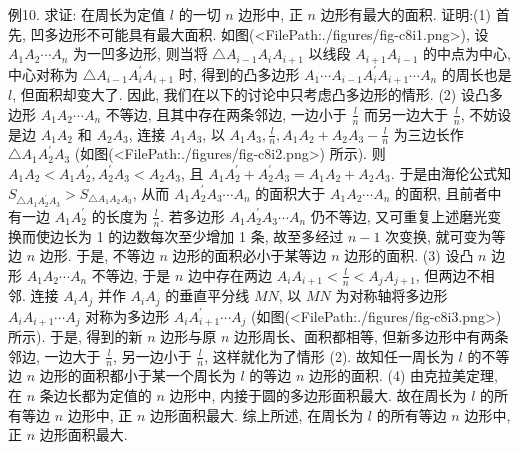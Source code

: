 例10. 求证: 在周长为定值 $l$ 的一切 $n$ 边形中, 正 $n$ 边形有最大的面积.
证明:(1) 首先, 凹多边形不可能具有最大面积.
如图(<FilePath:./figures/fig-c8i1.png>), 设 $A_1 A_2 \cdots A_n$ 为一凹多边形, 则当将 $\triangle A_{i-1} A_i A_{i+1}$ 以线段 $A_{i+1} A_{i-1}$ 的中点为中心, 中心对称为 $\triangle A_{i-1} A_i^{\prime} A_{i+1}$ 时, 得到的凸多边形 $A_1 \cdots A_{i-1} A_i^{\prime} A_{i+1} \cdots A_n$ 的周长也是 $l$, 但面积却变大了.
因此, 我们在以下的讨论中只考虑凸多边形的情形.
(2) 设凸多边形 $A_1 A_2 \cdots A_n$ 不等边, 且其中存在两条邻边, 一边小于 $\frac{l}{n}$ 而另一边大于 $\frac{l}{n}$, 不妨设是边 $A_1 A_2$ 和 $A_2 A_3$, 连接 $A_1 A_3$, 以 $A_1 A_3, \frac{l}{n}, A_1 A_2+ A_2 A_3-\frac{l}{n}$ 为三边长作 $\triangle A_1 A_2^{\prime} A_3$ (如图(<FilePath:./figures/fig-c8i2.png>) 所示).
则 $A_1 A_2<A_1 A_2^{\prime}, A_2^{\prime} A_3<A_2 A_3$, 且 $A_1 A_2^{\prime}+A_2^{\prime} A_3=A_1 A_2+A_2 A_3$.
于是由海伦公式知 $S_{\triangle A_1 A_2^{\prime} A_3}>S_{\triangle A_1 A_2 A_3}$, 从而 $A_1 A_2^{\prime} A_3 \cdots A_n$ 的面积大于 $A_1 A_2 \cdots A_n$ 的面积, 且前者中有一边 $A_1 A_2^{\prime}$ 的长度为 $\frac{l}{n}$.
若多边形 $A_1 A_2^{\prime} A_3 \cdots A_n$ 仍不等边, 又可重复上述磨光变换而使边长为 1 的边数每次至少增加 1 条, 故至多经过 $n-1$ 次变换, 就可变为等边 $n$ 边形.
于是, 不等边 $n$ 边形的面积必小于某等边 $n$ 边形的面积.
(3) 设凸 $n$ 边形 $A_1 A_2 \cdots A_n$ 不等边, 于是 $n$ 边中存在两边 $A_i A_{i+1}<\frac{l}{n}<A_j A_{j+1}$, 但两边不相邻.
连接 $A_i A_j$ 并作 $A_i A_j$ 的垂直平分线 $M N$, 以 $M N$ 为对称轴将多边形 $A_i A_{i+1} \cdots A_j$ 对称为多边形 $A_i A_{i+1}^{\prime} \cdots A_j$ (如图(<FilePath:./figures/fig-c8i3.png>) 所示).
于是, 得到的新 $n$ 边形与原 $n$ 边形周长、面积都相等, 但新多边形中有两条邻边, 一边大于
$\frac{l}{n}$, 另一边小于 $\frac{l}{n}$, 这样就化为了情形 (2).
故知任一周长为 $l$ 的不等边 $n$ 边形的面积都小于某一个周长为 $l$ 的等边 $n$ 边形的面积.
(4) 由克拉美定理, 在 $n$ 条边长都为定值的 $n$ 边形中, 内接于圆的多边形面积最大.
故在周长为 $l$ 的所有等边 $n$ 边形中, 正 $n$ 边形面积最大.
综上所述, 在周长为 $l$ 的所有等边 $n$ 边形中, 正 $n$ 边形面积最大.



